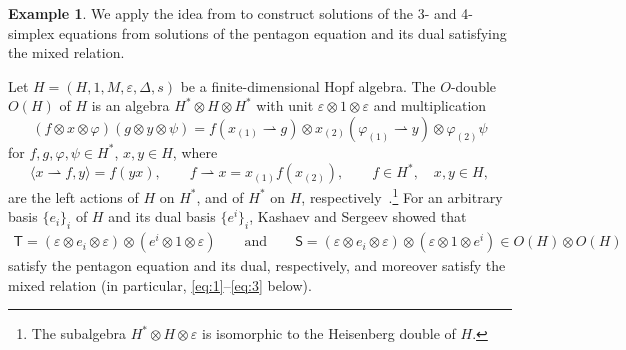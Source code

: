 \documentclass[10pt,a4paper]{amsart}
\numberwithin{equation}{section}
\theoremstyle{definition}
\newtheorem{Example}[Theorem]{Example}
\begin{document}
\begin{Example}\label{ex:tenterm from Hopf}
 We apply the idea from \cite[Section~4]{kashaev1998pentagon} to construct solutions of the 3- and 4-simplex equations from solutions of the pentagon equation and its dual satisfying the mixed relation.

 Let $H=(H,1,M,\varepsilon,\Delta,s)$ be a finite-dimensional Hopf algebra. The $O$-double $O(H)$ of $H$ is an algebra $H^*\otimes H\otimes H^*$ with unit $\varepsilon\otimes 1\otimes\varepsilon$ and multiplication
 \begin{equation*}
 (f\otimes x\otimes \varphi)(g\otimes y\otimes\psi) = f(x_{(1)}\rightharpoonup g)\otimes x_{(2)}(\varphi_{(1)}\rightharpoonup y)\otimes\varphi_{(2)}\psi
 \end{equation*}
for $f,g,\varphi,\psi\in H^*$, $x,y\in H$, where
\begin{equation*}
 \langle x\rightharpoonup f,y\rangle=f(yx),\qquad f\rightharpoonup x=x_{(1)}f(x_{(2)}),\qquad f\in H^*,\quad x,y\in H,
 \end{equation*}
 are the left actions of $H$ on $H^*$, and of $H^*$ on $H$, respectively~\cite{novikov2000various}.\footnote{The subalgebra $H^*\otimes H\otimes \varepsilon$ is isomorphic to the Heisenberg double of $H$.} For an arbitrary basis $\{e_i\}_i$ of $H$ and its dual basis $\{e^i\}_i$, Kashaev and Sergeev showed that
 \begin{gather*}
 \mathsf{T}=(\varepsilon\otimes e_i\otimes\varepsilon)\otimes(e^i\otimes 1\otimes\varepsilon)\!\qquad\text{and}\!\qquad \mathsf{S}=(\varepsilon\otimes e_i\otimes\varepsilon)\otimes(\varepsilon\otimes 1\otimes e^i)\in O(H)\otimes O(H)
 \end{gather*}
 satisfy the pentagon equation and its dual, respectively, and moreover satisfy the mixed relation (in particular, \eqref{eq:1}--\eqref{eq:3} below).


\end{Example}
\end{document}
